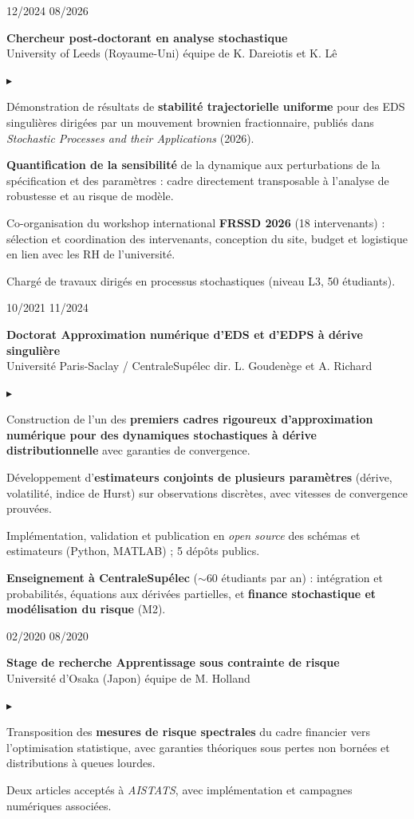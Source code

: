 \documentclass[10pt,a4paper]{article}
\newlength{\datecol}\setlength{\datecol}{0.165\textwidth}
\newlength{\gutter}\setlength{\gutter}{1em}
\newlength{\bodycol}
\newcommand{\entry}[3]{%
  \par\vspace{1.0ex plus 0.9ex minus 0.1ex}\noindent
  \begin{minipage}[t]{\datecol}
    \vspace{0pt}\raggedright\small\color{muted}#1
  \end{minipage}%
  \hspace{\gutter}%
  \begin{minipage}[t]{\bodycol}
    \vspace{0pt}\raggedright
    {\headingfont\bfseries\small #2}\\[0.15ex]
    {\small\color{accent}#3}
  \end{minipage}%
  \par\vspace{0.3ex}
}
\newenvironment{bullets}
  {\begin{list}{\textcolor{accent}{\scriptsize$\blacktriangleright$}}{%
      \setlength{\leftmargin}{\datecol}
      \addtolength{\leftmargin}{\gutter}
      \addtolength{\leftmargin}{1.25em}
      \setlength{\rightmargin}{0pt}
      \setlength{\labelwidth}{0.9em}
      \setlength{\labelsep}{0.35em}
      \setlength{\itemsep}{0.2ex}
      \setlength{\parsep}{0pt}
      \setlength{\topsep}{0.4ex}
      \setlength{\partopsep}{0pt}
      \small}}
  {\end{list}}
\begin{document}
\entry{12/2024 \textemdash{} 08/2026}{Chercheur post-doctorant en analyse stochastique}{University of Leeds (Royaume-Uni) \textemdash{} équipe de K. Dareiotis et K. Lê}
\begin{bullets}
  \item Démonstration de résultats de \textbf{stabilité trajectorielle uniforme} pour des EDS singulières
  dirigées par un mouvement brownien fractionnaire, publiés dans \emph{Stochastic Processes and their
  Applications} (2026).
  \item \textbf{Quantification de la sensibilité} de la dynamique aux perturbations de la spécification et
  des paramètres : cadre directement transposable à l'analyse de robustesse et au risque de modèle.
  \item Co-organisation du workshop international \textbf{FRSSD 2026} (18 intervenants) : sélection et
  coordination des intervenants, conception du site, budget et logistique en lien avec les RH de l'université.
  \item Chargé de travaux dirigés en processus stochastiques (niveau L3, 50 étudiants).
\end{bullets}

\pagebreak

\entry{10/2021 \textemdash{} 11/2024}{Doctorat \textemdash{} Approximation numérique d'EDS et d'EDPS à dérive singulière}{Université Paris-Saclay / CentraleSupélec \textemdash{} dir. L. Goudenège et A. Richard}
\begin{bullets}
  \item Construction de l'un des \textbf{premiers cadres rigoureux d'approximation numérique pour des
  dynamiques stochastiques à dérive distributionnelle} avec garanties de convergence.
  \item Développement d'\textbf{estimateurs conjoints de plusieurs paramètres} (dérive, volatilité, indice de
  Hurst) sur observations discrètes, avec vitesses de convergence prouvées.
  \item Implémentation, validation et publication en \emph{open source} des schémas et estimateurs
  (Python, MATLAB) ; 5 dépôts publics.
  \item \textbf{Enseignement à CentraleSupélec} ($\sim$60 étudiants par an) : intégration et probabilités,
  équations aux dérivées partielles, et \textbf{finance stochastique et modélisation du risque} (M2).
\end{bullets}

\entry{02/2020 \textemdash{} 08/2020}{Stage de recherche \textemdash{} Apprentissage sous contrainte de risque}{Université d'Osaka (Japon) \textemdash{} équipe de M. Holland}
\begin{bullets}
  \item Transposition des \textbf{mesures de risque spectrales} du cadre financier vers l'optimisation
  statistique, avec garanties théoriques sous pertes non bornées et distributions à queues lourdes.
  \item Deux articles acceptés à \emph{AISTATS}, avec implémentation et campagnes numériques associées.
\end{bullets}
\end{document}
